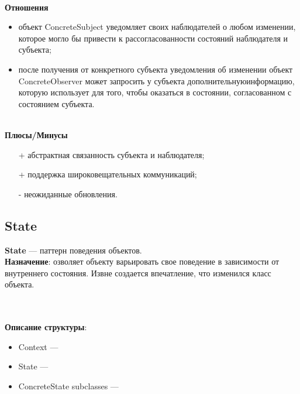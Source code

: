 \documentclass[a3paper,11pt]{report}
\def \boxSize {7cm}
\def \sboxSize {5cm}
\newcommand{\umlnoteND}[6]{
	\node[umlcd style, anchor=north, draw, shape=umlcdnote, text width=#2] at (#1) (note) {#3};
	\draw [umlcd style dashed line , ] (note.#4) ++(#5) --++(#6) coordinate(tmp) node[circle,inner sep=0pt,draw, fill=black!1, minimum size=5pt] (NoD) { };
}
\begin{document}
\textbf{\\Отношения}
\begin{itemize}
\item объект ConcreteSubject уведомляет своих наблюдателей о любом изменении, которое могло бы привести к рассогласованности состояний наблюдателя и субъекта;
\item после получения от конкретного субъекта уведомления об изменении объект ConcreteObserver может запросить у субъекта дополнительнуюинформацию, которую использует для того, чтобы оказаться в состоянии, согласованном с состоянием субъекта.
\end{itemize}

\textbf{\\Плюсы/Минусы}
\begin{itemize}
\item [+] абстрактная связанность субъекта и наблюдателя;
\item [+] поддержка широковещательных коммуникаций;
\item [-] неожиданные обновления.
\end{itemize}

\newpage
\subsection{State}

\large\textbf{State} --- паттерн поведения объектов.
\\
\large\textbf{Назначение}: озволяет объекту варьировать свое поведение в зависимости от внутреннего состояния. Извне создается впечатление, что изменился класс объекта.
\\

\\\\
\textbf{Описание структуры}:
\begin{itemize}
\item Context --- 
\item State ---
\item ConcreteState subclasses ---
\end{itemize}
\end{document}
